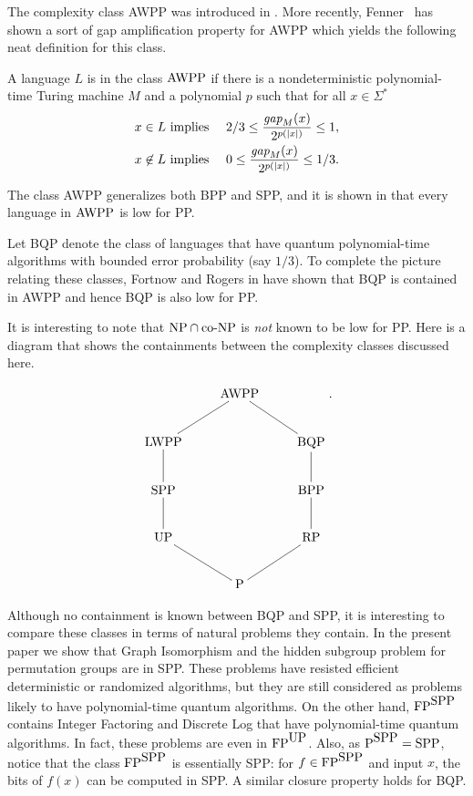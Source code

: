 \documentclass{elsart}
\newcommand{\p}{\mbox{\rm P}}
\newcommand{\UP}{\mbox{\rm UP}}
\newcommand{\NP}{\mbox{\rm NP}}
\newcommand{\FP}{\mbox{\rm FP}}
\newcommand{\coNP}{\mbox{\rm co-NP}}
\newcommand{\SPP}{\mbox{\rm SPP}}
\newcommand{\gap}{\mbox{\it gap}}
\newcommand{\AWPP}{\mbox{\rm AWPP}}
\begin{document}
The complexity class AWPP was introduced in \cite{fenner93oracle}.
More recently, Fenner~\cite{Fe03} has shown a sort of gap
amplification property for AWPP which yields the following neat
definition for this class.
\begin{defn}
  A language $L$ is in the class $\AWPP$ if there is a
  nondeterministic polynomial-time Turing machine $M$ and a polynomial
  $p$ such that for all $x\in\Sigma^*$
\begin{eqnarray*}
x\in L & \textrm{ implies } & 2/3\leq \frac{\gap_M(x)}{2^{p(|x|)}}\leq 1,\\
x\not\in L & \textrm{ implies } & 0\leq \frac{\gap_M(x)}{2^{p(|x|)}}\leq 1/3.
\end{eqnarray*}
\end{defn}
The class AWPP generalizes both BPP and SPP, and it is shown in
\cite{fenner93oracle} that every language in $\AWPP$ is low for PP.

Let BQP denote the class of languages that have quantum
polynomial-time algorithms with bounded error probability (say $1/3$).
To complete the picture relating these classes, Fortnow and Rogers in
\cite{fortnow98complexity} have shown that BQP is contained in AWPP
and hence BQP is also low for PP.

It is interesting to note that $\NP\cap\coNP$ is \emph{not} known to
be low for PP. Here is a diagram that shows the containments between
the complexity classes discussed here.

\[
\xymatrix{
  &\textrm{AWPP}& \\
  \textrm{LWPP} \ar@{-}[ur] & & \ar@{-}[ul]\textrm{BQP} \\
  \textrm{SPP} \ar@{-}[u] & & \ar@{-}[u] \textrm{BPP} \\
  \textrm{UP}  \ar@{-}[u]  & & \ar@{-}[u] \textrm{RP}\\
  & \ar@{-}[ur] \textrm{P} \ar@{-}[ul] & }.
\]

Although no containment is known between BQP and SPP, it is
interesting to compare these classes in terms of natural problems they
contain. In the present paper we show that Graph Isomorphism and the
hidden subgroup problem for permutation groups are in SPP. These
problems have resisted efficient deterministic or randomized
algorithms, but they are still considered as problems likely to have
polynomial-time quantum algorithms. On the other hand, $\FP^{\SPP}$
contains Integer Factoring and Discrete Log that have polynomial-time
quantum algorithms. In fact, these problems are even in $\FP^{\UP}$.
Also, as $\p^{\SPP}=\SPP$, notice that the class $\FP^{\SPP}$ is
essentially SPP: for $f\in\FP^{\SPP}$ and input $x$, the bits of
$f(x)$ can be computed in SPP. A similar closure property holds for
BQP.
\end{document}
